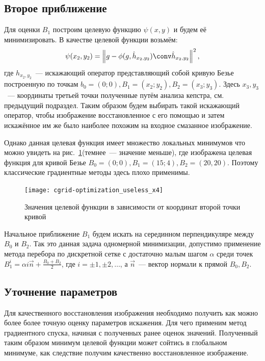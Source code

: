 \subsection{Второе приближение}
Для оценки $B_1$ построим целевую функцию $\psi(x,y)$ и будем её минимизировать. В качестве целевой функции возьмём:
\begin{equation}\label{eq:costFunction}
	\psi(x_2,y_2) = \left\|g - \phi(g, \hat{h}_{x_2,y_2}) \conv \hat{h}_{x_2,y_2}\right\|^2,
\end{equation}
где $h_{x_2,y_2}$~--- искажающий оператор представляющий собой кривую Безье построенную по точкам $b_0=(0;0), B_1=(x_2;y_2), B_2=(x_3;y_3)$. Здесь $x_3, y_3$~--- координаты третьей точки полученные путём анализа кепстра, см. предыдущий подраздел. Таким образом будем выбирать такой искажающий оператор, чтобы изображение восстановленное с его помощью и затем искажённое им же было наиболее похожим на входное смазанное изображение.

Однако данная целевая функция имеет множество локальных минимумов что можно увидеть на рис.~\ref{fig:costFunctionGrid}(темнее~--- значение меньше), где изображена целевая функция для кривой Безье $B_0=(0;0), B_1=(15;4), B_2=(20, 20)$. Поэтому классические градиентные методы здесь плохо применимы.
\begin{figure}[h!]
	\centering\texttt{[image: cgrid-optimization\_useless\_x4]}
	\caption{Значения целевой функции в зависимости от координат второй точки кривой}
	\label{fig:costFunctionGrid}
\end{figure}

Начальное приближение $B_1$ будем искать на серединном перпендикуляре между $B_0$ и $B_2$. Так это данная задача одномерной минимизации, допустимо применение метода перебора по дискретной сетке с достаточно малым шагом $\alpha$ среди точек $B_1^i = \alpha i \vec{n}+\frac{B_0+B_2}{2}$, где $i = \pm 1, \pm 2, \dots$, а $\vec{n}$~--- вектор нормали к прямой $B_0,B_2$.

\subsection{Уточнение параметров}
Для качественного восстановления изображения необходимо получить как можно более более точную оценку параметров искажения. Для чего применим метод градиентного спуска, начиная с полученных ранее оценок значений. Полученный таким образом минимум целевой функции может сойтись в глобальном минимуме, как следствие получим качественно восстановленное изображение.

